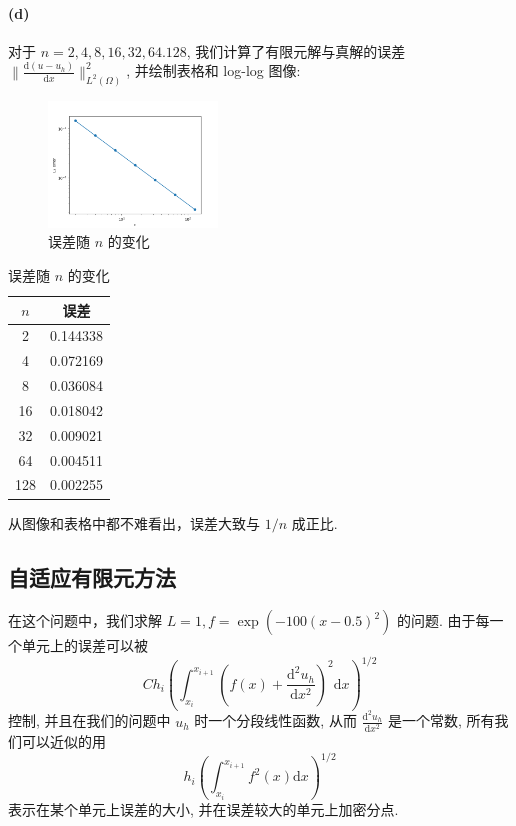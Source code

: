 \documentclass[UTF8]{article}
\begin{document}
    \paragraph{(d)}
    对于 $n = 2,4,8,16,32,64.128$, 我们计算了有限元解与真解的误差 $\lVert \frac{\textrm{d}(u-u_h)}{\textrm{d}x} \rVert^2_{L^2(\Omega)}$, 并绘制表格和 log-log 图像:

    \begin{figure}
        \centering
        \caption{误差随 $n$ 的变化}
        \includegraphics[width=0.4\textwidth]{./assets/fig1}
    \end{figure}

    \begin{table}
        \centering
        \caption{误差随 $n$ 的变化}
        \begin{tabular}{|c|c|}
            \hline
            $n$ & 误差       \\
            \hline
            2   & 0.144338 \\
            4   & 0.072169 \\
            8   & 0.036084 \\
            16  & 0.018042 \\
            32  & 0.009021 \\
            64  & 0.004511 \\
            128 & 0.002255 \\
            \hline
        \end{tabular}
    \end{table}

    从图像和表格中都不难看出，误差大致与 $1/n$ 成正比.

    \subsection{自适应有限元方法}

    在这个问题中，我们求解 $L=1, f=\exp(-100 (x-0.5)^2)$ 的问题.
    由于每一个单元上的误差可以被
    \[
        Ch_i\left( \int_{x_i}^{x_{i+1}} \left( f(x)+ \frac{\textrm{d}^2 u_h}{\textrm{d}x^2}\right)^2 \textrm{d}x \right)^{1/2}
    \]
    控制, 并且在我们的问题中 $u_h$ 时一个分段线性函数, 从而 $\frac{\textrm{d}^2 u_h}{\textrm{d}x^2}$ 是一个常数, 所有我们可以近似的用
    \[
        h_i\left( \int_{x_i}^{x_{i+1}} f^2(x)\textrm{d}x \right)^{1/2}
    \]
    表示在某个单元上误差的大小, 并在误差较大的单元上加密分点.
\end{document}
